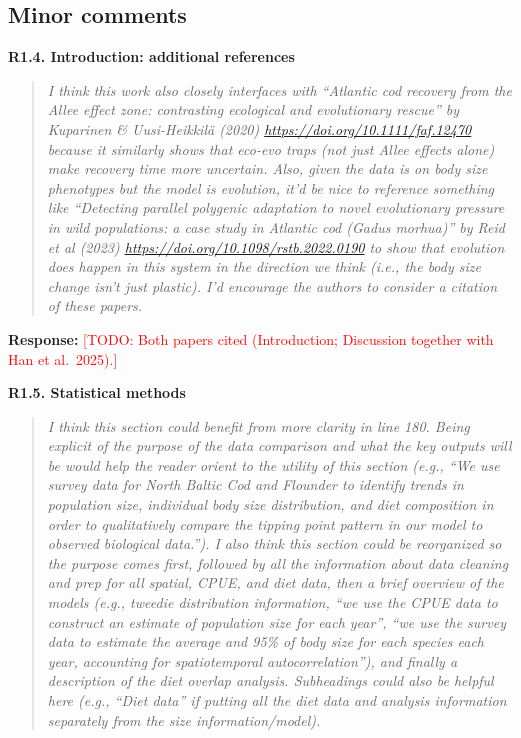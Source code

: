 \documentclass[11pt]{article}
\newenvironment{revcomment}[1]
  {\par\medskip\noindent\textbf{#1}\par\begin{quote}\itshape\color{commentgrey}}
  {\end{quote}}
\newcommand{\response}{\par\noindent\textbf{Response:} }
\newcommand{\todo}[1]{\textcolor{red}{[TODO: #1]}}
\begin{document}
\subsection*{Minor comments}

\begin{revcomment}{R1.4. Introduction: additional references}
I think this work also closely interfaces with ``Atlantic cod recovery from the Allee effect zone: contrasting ecological and evolutionary rescue'' by Kuparinen \& Uusi-Heikkil\"a (2020) \url{https://doi.org/10.1111/faf.12470} because it similarly shows that eco-evo traps (not just Allee effects alone) make recovery time more uncertain. Also, given the data is on body size phenotypes but the model is evolution, it'd be nice to reference something like ``Detecting parallel polygenic adaptation to novel evolutionary pressure in wild populations: a case study in Atlantic cod (\textit{Gadus morhua})'' by Reid et al (2023) \url{https://doi.org/10.1098/rstb.2022.0190} to show that evolution does happen in this system in the direction we think (i.e., the body size change isn't just plastic). I'd encourage the authors to consider a citation of these papers.
\end{revcomment}

\response \todo{Both papers cited (Introduction; Discussion together with Han et al.\ 2025).}

\begin{revcomment}{R1.5. Statistical methods}
I think this section could benefit from more clarity in line 180. Being explicit of the purpose of the data comparison and what the key outputs will be would help the reader orient to the utility of this section (e.g., ``We use survey data for North Baltic Cod and Flounder to identify trends in population size, individual body size distribution, and diet composition in order to qualitatively compare the tipping point pattern in our model to observed biological data.''). I also think this section could be reorganized so the purpose comes first, followed by all the information about data cleaning and prep for all spatial, CPUE, and diet data, then a brief overview of the models (e.g., tweedie distribution information, ``we use the CPUE data to construct an estimate of population size for each year'', ``we use the survey data to estimate the average and 95\% of body size for each species each year, accounting for spatiotemporal autocorrelation''), and finally a description of the diet overlap analysis. Subheadings could also be helpful here (e.g., ``Diet data'' if putting all the diet data and analysis information separately from the size information/model).
\end{revcomment}
\end{document}

